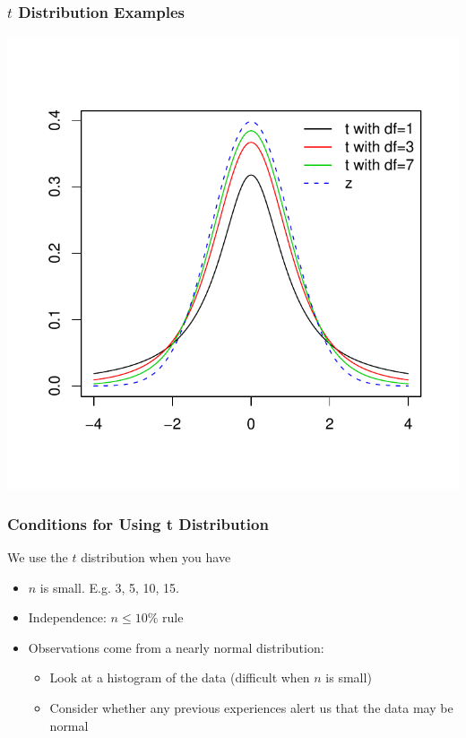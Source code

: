 \documentclass[handout]{beamer}
\newcommand{\blue}[1]{\textcolor{blue2}{#1}}
\begin{document}
\addtocounter{framenumber}{-1}
\begin{frame}
\frametitle{$t$ Distribution Examples}
\begin{center}
\includegraphics{figure/lec16-004}
\end{center}
\end{frame}


\begin{frame}
\frametitle{Conditions for Using t Distribution}
%
%
We use the $t$ distribution when you have

\begin{itemize}
\pause \item $n$ is small. E.g. 3, 5, 10, 15.
\pause \item \blue{Independence}: $n \leq 10\% $ rule
\pause \item \blue{Observations come from a nearly normal distribution}:
\begin{itemize}
\item Look at a histogram of the data (difficult when $n$ is small)
\item Consider whether any previous experiences alert us that the data may be normal
\end{itemize}
\end{itemize}  
	
\end{frame}
\end{document}
